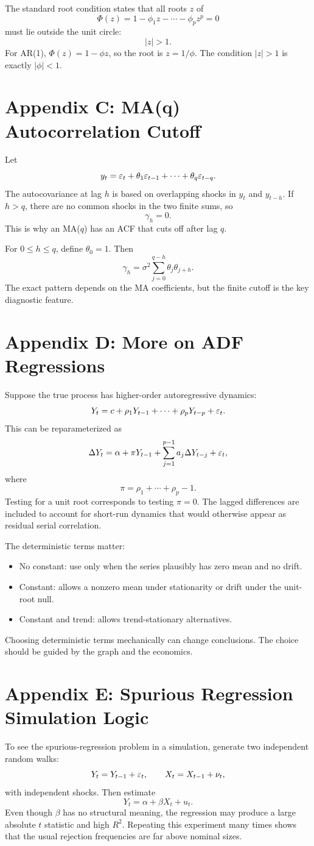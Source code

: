 The standard root condition states that all roots $z$ of
\[
\Phi(z)=1-\phi_1z-\cdots-\phi_pz^p=0
\]
must lie outside the unit circle:
\[
|z|>1.
\]
For AR(1), $\Phi(z)=1-\phi z$, so the root is $z=1/\phi$. The condition $|z|>1$ is exactly $|\phi|<1$.

\section{Appendix C: MA(q) Autocorrelation Cutoff}
Let
\[
y_t=\varepsilon_t+\theta_1\varepsilon_{t-1}+\cdots+\theta_q\varepsilon_{t-q}.
\]
The autocovariance at lag $h$ is based on overlapping shocks in $y_t$ and $y_{t-h}$. If $h>q$, there are no common shocks in the two finite sums, so
\[
\gamma_h=0.
\]
This is why an MA($q$) has an ACF that cuts off after lag $q$.

For $0\leq h\leq q$, define $\theta_0=1$. Then
\[
\gamma_h=\sigma^2\sum_{j=0}^{q-h}\theta_j\theta_{j+h}.
\]
The exact pattern depends on the MA coefficients, but the finite cutoff is the key diagnostic feature.

\section{Appendix D: More on ADF Regressions}
Suppose the true process has higher-order autoregressive dynamics:
\[
Y_t=c+\rho_1Y_{t-1}+\cdots+\rho_pY_{t-p}+\varepsilon_t.
\]
This can be reparameterized as
\[
\Delta Y_t=\alpha+\pi Y_{t-1}
+\sum_{j=1}^{p-1}a_j\Delta Y_{t-j}+\varepsilon_t,
\]
where
\[
\pi=\rho_1+\cdots+\rho_p-1.
\]
Testing for a unit root corresponds to testing $\pi=0$. The lagged differences are included to account for short-run dynamics that would otherwise appear as residual serial correlation.

The deterministic terms matter:
\begin{itemize}
\item No constant: use only when the series plausibly has zero mean and no drift.
\item Constant: allows a nonzero mean under stationarity or drift under the unit-root null.
\item Constant and trend: allows trend-stationary alternatives.
\end{itemize}
Choosing deterministic terms mechanically can change conclusions. The choice should be guided by the graph and the economics.

\section{Appendix E: Spurious Regression Simulation Logic}
To see the spurious-regression problem in a simulation, generate two independent random walks:
\[
Y_t=Y_{t-1}+\varepsilon_t,
\qquad
X_t=X_{t-1}+\nu_t,
\]
with independent shocks. Then estimate
\[
Y_t=\alpha+\beta X_t+u_t.
\]
Even though $\beta$ has no structural meaning, the regression may produce a large absolute $t$ statistic and high $R^2$. Repeating this experiment many times shows that the usual rejection frequencies are far above nominal sizes.

